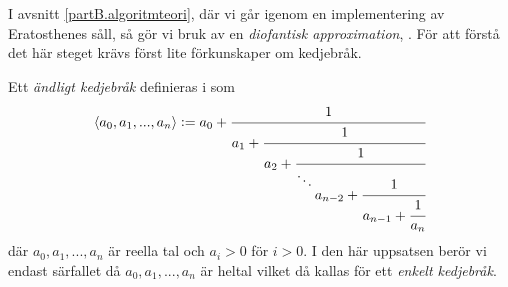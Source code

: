 
I avsnitt \ref{partB.algoritmteori}, där vi går igenom en implementering av Eratosthenes såll, så gör vi bruk av en \textit{diofantisk approximation}, \cite[algoritm 4]{HaraldSieve}. För att förstå det här steget krävs först lite förkunskaper om kedjebråk. 

Ett \textit{ändligt kedjebråk} definieras i \cite[definition 20.1]{Lindahl} som
\begin{align*}
    \langle a_0, a_1, ..., a_n \rangle := a_0 + \cfrac{1}{a_1 + \cfrac{1}{a_2 + \cfrac{1}{\ddots \raisebox{-3mm}{$a_{n-2}+\cfrac{1}{a_{n-1} + \cfrac{1}{a_n}}$}}}}
\end{align*}
där \(a_0, a_1, ..., a_n\) är reella tal och \(a_i > 0\) för \(i > 0\). I den här uppsatsen berör vi endast särfallet då \(a_0, a_1, ..., a_n\) är heltal vilket då kallas för ett \textit{enkelt kedjebråk}. 

